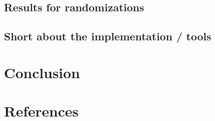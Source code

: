 \documentclass[a4paper,10pt]{article}
\theoremstyle{plain}
\theoremstyle{definition}
\begin{document}
\subsection{Results for randomizations}

\subsection{Short about the implementation / tools}

\newpage
\section{Conclusion}

\newpage
\section{References}
\end{document}
